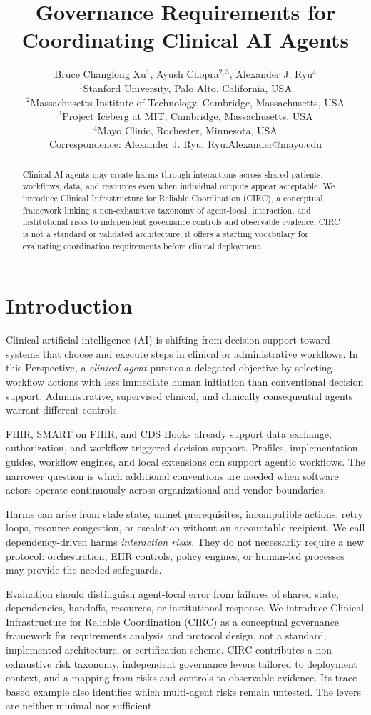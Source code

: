 \documentclass[10pt]{article}
\title{\textbf{Governance Requirements for Coordinating Clinical AI Agents}}
\author{%
Bruce Changlong Xu$^{1}$, Ayush Chopra$^{2,3}$, Alexander J. Ryu$^{4}$\\[0.5em]
\small $^{1}$Stanford University, Palo Alto, California, USA\\
\small $^{2}$Massachusetts Institute of Technology, Cambridge, Massachusetts, USA\\
\small $^{3}$Project Iceberg at MIT, Cambridge, Massachusetts, USA\\
\small $^{4}$Mayo Clinic, Rochester, Minnesota, USA\\[0.5em]
\small Correspondence: Alexander J. Ryu, \href{mailto:Ryu.Alexander@mayo.edu}{Ryu.Alexander@mayo.edu}}
\date{}
\begin{document}
\maketitle

\begin{abstract}
Clinical AI agents may create harms through interactions across shared patients, workflows, data, and
resources even when individual outputs appear acceptable. We introduce Clinical Infrastructure for
Reliable Coordination (CIRC), a conceptual framework linking a non-exhaustive taxonomy of agent-local,
interaction, and institutional risks to independent governance controls and observable evidence. CIRC
is not a standard or validated architecture; it offers a starting vocabulary for evaluating
coordination requirements before clinical deployment.
\end{abstract}

\section{Introduction}

Clinical artificial intelligence (AI) is shifting from decision support toward systems that choose
and execute steps in clinical or administrative workflows.\cite{moritz2025coordinated,
borkowski2025multiagent,taylor2025agents} In this Perspective, a \emph{clinical agent} pursues a
delegated objective by selecting workflow actions with less immediate human initiation than
conventional decision support. Administrative, supervised clinical, and clinically consequential
agents warrant different controls.

FHIR, SMART on FHIR, and CDS Hooks already support data exchange, authorization, and
workflow-triggered decision support.\cite{hl7fhir2019,hl7cdshooks2018,mandel2016smart} Profiles,
implementation guides, workflow engines, and local extensions can support agentic workflows. The
narrower question is which additional conventions are needed when software actors operate
continuously across organizational and vendor boundaries.

Harms can arise from stale state, unmet prerequisites, incompatible actions, retry loops, resource
congestion, or escalation without an accountable recipient. We call dependency-driven harms
\emph{interaction risks}. They do not necessarily require a new protocol: orchestration, EHR
controls, policy engines, or human-led processes may provide the needed safeguards.

Evaluation should distinguish agent-local error from failures of shared state, dependencies,
handoffs, resources, or institutional response. We introduce Clinical Infrastructure for Reliable
Coordination (CIRC) as a conceptual governance framework for requirements analysis and protocol
design, not a standard, implemented architecture, or certification scheme. CIRC contributes a
non-exhaustive risk taxonomy, independent governance levers tailored to deployment context, and a
mapping from risks and controls to observable evidence. Its trace-based example also identifies which
multi-agent risks remain untested. The levers are neither minimal nor sufficient.
\end{document}
